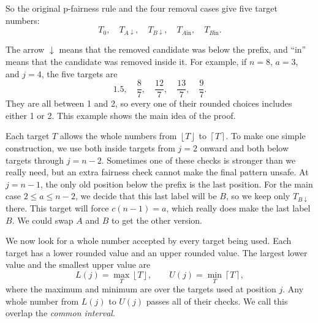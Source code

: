 \documentclass[11pt]{article}
\newcommand{\floor}[1]{\left\lfloor #1\right\rfloor}
\newcommand{\ceil}[1]{\left\lceil #1\right\rceil}
\begin{document}
So the original p-fairness rule and the four removal cases give five target
numbers:
\[
 T_0,\quad T_{A\downarrow},\quad T_{B\downarrow},\quad
 T_{A\mathrm{in}},\quad T_{B\mathrm{in}}.
\]

The arrow $\downarrow$ means that the removed candidate was below the prefix,
and ``in'' means that the candidate was removed inside it.  For example, if
$n=8$, $a=3$, and $j=4$, the five targets are
\[
  1.5,\quad \frac87,\quad \frac{12}7,\quad
  \frac{13}7,\quad \frac97.
\]
They are all between 1 and 2, so every one of their rounded choices includes
either 1 or 2.  This example shows the main idea of the proof.

Each target $T$ allows the whole numbers from $\floor{T}$ to $\ceil{T}$.  To
make one simple construction, we use both inside targets from $j=2$ onward
and both below targets through $j=n-2$.  Sometimes one of these checks is
stronger than we really need, but an extra fairness check cannot make the
final pattern unsafe.  At $j=n-1$, the only old position below the prefix is
the last position.  For the main case $2\le a\le n-2$, we decide that this
last label will be $B$, so we keep only $T_{B\downarrow}$ there.  This target
will force $c(n-1)=a$, which really does make the last label $B$.  We could
swap $A$ and $B$ to get the other version.

We now look for a whole number accepted by every target being used.  Each
target has a lower rounded value and an upper rounded value.  The largest
lower value and the smallest upper value are
\[
 L(j)=\max_T\floor{T},\qquad
 U(j)=\min_T\ceil{T},
\]
where the maximum and minimum are over the targets used at position $j$.  Any
whole number from $L(j)$ to $U(j)$ passes all of their checks.  We call this
overlap the \emph{common interval}.
\end{document}
